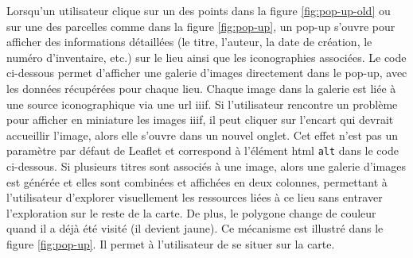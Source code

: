 Lorsqu'un utilisateur clique sur un des points dans la figure \ref{fig:pop-up-old} ou sur une des parcelles comme dans la figure \ref{fig:pop-up}, un pop-up s'ouvre pour afficher des informations détaillées (le titre, l'auteur, la date de création, le numéro d'inventaire, etc.) sur le lieu ainsi que les iconographies associées. Le code ci-dessous permet d'afficher une galerie d'images directement dans le pop-up, avec les données récupérées pour chaque lieu. Chaque image dans la galerie est liée à une source iconographique via une \acrshort{url} \acrshort{iiif}. Si l'utilisateur rencontre un problème pour afficher en miniature les images \acrshort{iiif}, il peut cliquer sur l'encart qui devrait accueillir l'image, alors elle s'ouvre dans un nouvel onglet. Cet effet n'est pas un paramètre par défaut de Leaflet et correspond à l'élément \acrshort{html} \texttt{alt} dans le code ci-dessous. Si plusieurs titres sont associés à une image, alors une galerie d'images est générée et elles sont combinées et affichées en deux colonnes, permettant à l'utilisateur d'explorer visuellement les ressources liées à ce lieu sans entraver l'exploration sur le reste de la carte. De plus, le polygone change de couleur quand il a déjà été visité (il devient jaune). Ce mécanisme est illustré dans le figure \ref{fig:pop-up}. Il permet à l'utilisateur de se situer sur la carte. 

